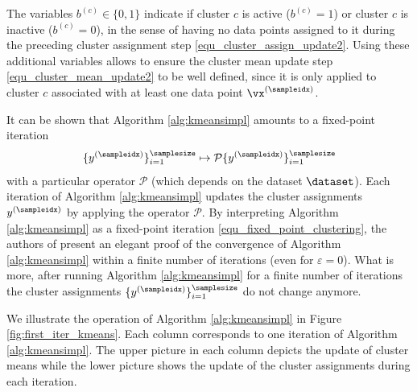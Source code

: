 \documentclass[12pt]{report}
\begin{document}
The variables $b^{(c)} \in \{0,1\}$ indicate if cluster $c$ is active ($b^{(c)}= 1$) or cluster 
$c$ is inactive ($b^{(c)}=0$), in the sense of having no data points assigned to it during the preceding 
cluster assignment step \eqref{equ_cluster_assign_update2}. Using these additional variables 
allows to ensure the cluster mean update step \eqref{equ_cluster_mean_update2} to be well defined, 
since it is only applied to cluster $c$ associated with at least one data point $\vx^{(\sampleidx)}$. 

It can be shown that Algorithm \ref{alg:kmeansimpl} amounts to a fixed-point iteration 
\begin{equation}
\label{equ_fixed_point_clustering}
\{ y^{(\sampleidx)} \}_{i=1}^{\samplesize} \mapsto \mathcal{P}  \{ y^{(\sampleidx)} \}_{i=1}^{\samplesize}
\end{equation}
with a particular operator $\mathcal{P}$ (which depends on the dataset $\dataset$). Each iteration of 
Algorithm \ref{alg:kmeansimpl} updates the cluster assignments $y^{(\sampleidx)}$ by applying the 
operator $\mathcal{P}$. By interpreting Algorithm \ref{alg:kmeansimpl} as a fixed-point iteration 
\eqref{equ_fixed_point_clustering}, the authors of \cite[Thm. 2]{Gray1980} present an elegant 
proof of the convergence of Algorithm \ref{alg:kmeansimpl} within a finite number of iterations 
(even for $\varepsilon = 0$). What is more, after running Algorithm \ref{alg:kmeansimpl} for a finite 
number of iterations the cluster assignments $\{ y^{(\sampleidx)} \}_{i=1}^{\samplesize}$ do not change anymore.   

We illustrate the operation of Algorithm \ref{alg:kmeansimpl} in Figure \ref{fig:first_iter_kmeans}. Each column 
corresponds to one iteration of Algorithm \ref{alg:kmeansimpl}. The upper picture in each column depicts the 
update of cluster means while the lower picture shows the update of the cluster assignments during each iteration. 
\end{document}
